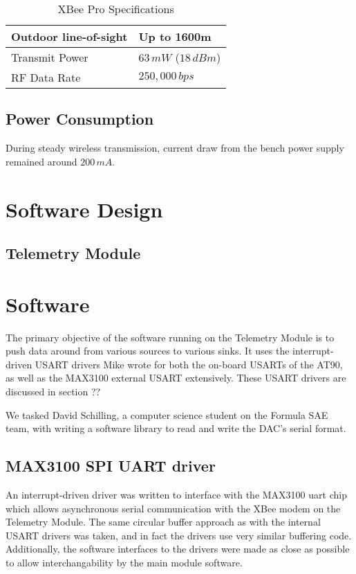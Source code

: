 %
\begin{table}
\centering{}\caption{XBee Pro Specifications}
\begin{tabular}{|l|l|}
\hline 
Outdoor line-of-sight  & Up to 1600m\tabularnewline
\hline 
Transmit Power  & $63\, mW$ ($18\, dBm$)\tabularnewline
\hline 
RF Data Rate  & $250,000\, bps$\tabularnewline
\hline
\end{tabular}
\end{table}

\subsection{Power Consumption}

During steady wireless transmission, current draw from the bench power supply remained around $200\, mA$.

\section{Software Design}

\subsection{Telemetry Module}

\section{Software}

The primary objective of the software running on the Telemetry Module is to push data around from various sources to various sinks. It uses the interrupt-driven USART drivers Mike wrote for both the on-board USARTs of the AT90, as well as the MAX3100 external USART extensively. These USART drivers are discussed in section ?? %

We tasked David Schilling, a computer science student on the Formula SAE team, with writing a software library to read and write the DAC's serial format.

\subsection{MAX3100 SPI UART driver}

An interrupt-driven driver was written to interface with the MAX3100 uart chip which allows asynchronous serial communication with the XBee modem on the Telemetry Module. The same circular buffer approach as with the internal USART drivers was taken, and in fact the drivers use very similar buffering code. Additionally, the software interfaces to the drivers were made as close as possible to allow interchangability by the main module software.

